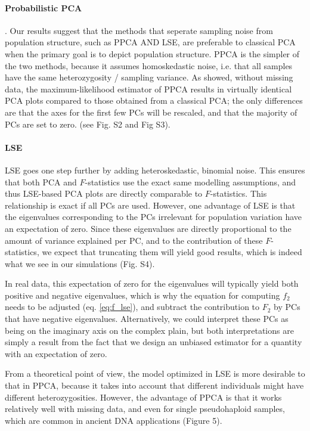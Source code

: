 \documentclass[12pt, letterpaper]{article}
\begin{document}
\paragraph{Probabilistic PCA}. Our results suggest that the methods that seperate sampling noise from population structure, such as PPCA AND LSE, are preferable to classical PCA when the primary goal is to depict population structure. PPCA is the simpler of the two methods, because it assumes homoskedastic noise, i.e. that all samples have the same heterozygosity / sampling variance. As \cite{tipping_probabilistic_nodate} showed, without missing data, the maximum-likelihood estimator of PPCA results in virtually identical PCA plots compared to those obtained from a classical PCA; the only differences are that the axes for the first few PCs will be rescaled, and that the majority of PCs are set to zero. (see Fig. S2 and Fig S3).


\paragraph{LSE}
LSE goes one step further by adding heteroskedastic, binomial noise. This ensures that both PCA and $F$-statistics use the exact same modelling assumptions, and thus LSE-based PCA plots are directly comparable to $F$-statistics. This relationship is exact if all PCs are used. However, one advantage of LSE is that the eigenvalues corresponding to the PCs irrelevant for population variation have an expectation of zero. Since these eigenvalues are directly proportional to the amount of variance explained per PC, and to the contribution of these $F$-statistics, we expect that truncating them will yield good results, which is indeed what we see in our simulations (Fig. S4). 

In real data, this expectation of zero for the eigenvalues will typically yield both positive and negative eigenvalues, which is why the equation for computing $f_2$ needs to be adjusted (eq. \ref{eq:f_lse}), and subtract the contribution to $F_2$ by PCs that have negative eigenvalues. Alternatively, we could interpret these PCs as being on the imaginary axis on the complex plain, but both interpretations are simply a result from the fact that we design an unbiased estimator for a quantity with an expectation of zero. 

From a theoretical point of view, the model optimized in LSE is more desirable to that in PPCA, because it takes into account that different individuals might have different heterozygosities. However, the advantage of PPCA is that it works relatively well with missing data, and even for single pseudohaploid samples, which are common in ancient DNA applications (Figure 5). 
\end{document}
